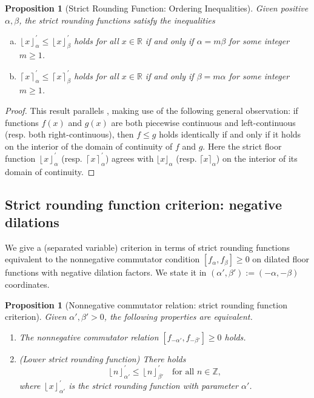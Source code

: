 \documentclass[11pt, letterpaper, reqno]{amsart}
\newtheorem{prop}[thm]{Proposition}
\theoremstyle{definition}
\theoremstyle{remark}
\numberwithin{equation}{section}
\newcommand{\RR}{\ensuremath{\mathbb{R}}}
\newcommand{\ZZ}{\ensuremath{\mathbb{Z}}}
\newcommand{\floor}[1]{\lfloor{#1}\rfloor}
\newcommand{\ceil}[1]{\lceil{#1}\rceil}
\newcommand{\sfloor}[1]{\left\lfloor{#1}\right\rfloor^{'}}
\newcommand{\sceil}[1]{\left\lceil{#1}\right\rceil^{'}}
\newcommand{\alphap}{{\alpha'}}
\newcommand{\betap}{{\beta'}}
\begin{document}
\begin{prop}[Strict  Rounding Function: Ordering Inequalities]
\label{prop:strict-rounding-relations}
Given positive $\alpha, \beta$,  the strict rounding functions satisfy the inequalities
\begin{enumerate}[(a)]
\item   $\sfloor{x}_{\alpha} \leq \sfloor{x}_{\beta}$ holds for all $x\in\RR$ if and only if 
$\alpha= m \beta$ for some integer $m\geq 1$.

\item 
$\sceil{x}_{\alpha} \leq \sceil{x}_{\beta}$  holds for all $x\in\RR$ if and only if 
$\beta = m\alpha$ for some integer $m\geq 1$.
\end{enumerate}
\end{prop}

\begin{proof}
This result parallels
\cite[Prop. 4.2]{LagR:2018a},
 making  use of the following general observation: if functions $f(x)$ and $g(x)$ are 
both piecewise continuous and left-continuous (resp. both right-continuous), then
$f \leq g$ holds identically
 if and only if it holds on the interior of the domain of continuity of $f$ and $g$.
Here  the  strict floor function $\sfloor{x}_{ \alpha}$ (resp. $\sceil{x}_{ \alpha}$) agrees with 
$\floor{x}_{\alpha}$ (resp. $\ceil{x}_{\alpha}$) on the interior of its domain of continuity.
\end{proof}

%
%
\subsection{Strict rounding function criterion: negative dilations}
\label{sec:nge-rounding-crit}

We  give a (separated variable) criterion in terms of strict rounding functions  
equivalent to the nonnegative commutator condition $[f_\alpha,f_\beta]\geq 0$
on dilated floor functions with negative dilation factors. We state it in 
$(\alphap, \betap) := (-\alpha, -\beta)$ coordinates.

\begin{prop}[Nonnegative commutator relation: strict rounding function criterion]
\label{prop:rounding-neg}
Given
${\alphap, \betap > 0}$, the following properties are equivalent.
 \begin{enumerate}
 \item[\textnormal{(R1')}]
 The nonnegative commutator relation
 $[f_{-\alphap}, f_{-\betap}]\geq 0$ holds.
 \item[\textnormal{(R2')}]
(Lower strict rounding function) There holds
\begin{equation}\label{rounding-negative}
\sfloor{n}_{\alphap} \leq \sfloor{n}_{\betap} \quad\text{for all }n\in \ZZ,
\end{equation}
where $\sfloor{x}_\alphap $
is the  strict rounding function with parameter $\alphap$. 
\end{enumerate}
\end{prop}
\end{document}
